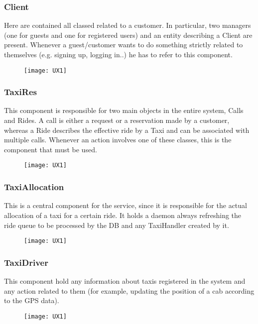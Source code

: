 \newpage
\subsubsection{Client} %
Here are contained all classed related to a customer. In particular, two managers (one for guests and one for registered users) and an entity describing a Client are present. Whenever a guest/customer wants to do something strictly related to themselves (e.g. signing up, logging in..) he has to refer to this component.
\begin{figure}[h!]
    \centering
    \texttt{[image: UX1]}
\end{figure}
        
\newpage
\subsubsection{TaxiRes} %
This component is responsible for two main objects in the entire system, Calls and Rides. A call is either a request or a reservation made by a customer, whereas a Ride describes the effective ride by a Taxi and can be associated with multiple calls. Whenever an action involves one of these classes, this is the component that must be used.
\begin{figure}[h!]
    \centering
    \texttt{[image: UX1]}
\end{figure}
        
\newpage
\subsubsection{TaxiAllocation} %
This is a central component for the service, since it is responsible for the actual allocation of a taxi for a certain ride. It holds a daemon always refreshing the ride queue to be processed by the DB and any TaxiHandler created by it.
\begin{figure}[h!]
    \centering
    \texttt{[image: UX1]}
\end{figure}

\newpage
\subsubsection{TaxiDriver} %
This component hold any information about taxis registered in the system and any action related to them (for example, updating the position of a cab according to the GPS data).
\begin{figure}[h!]
    \centering
    \texttt{[image: UX1]}
\end{figure}

